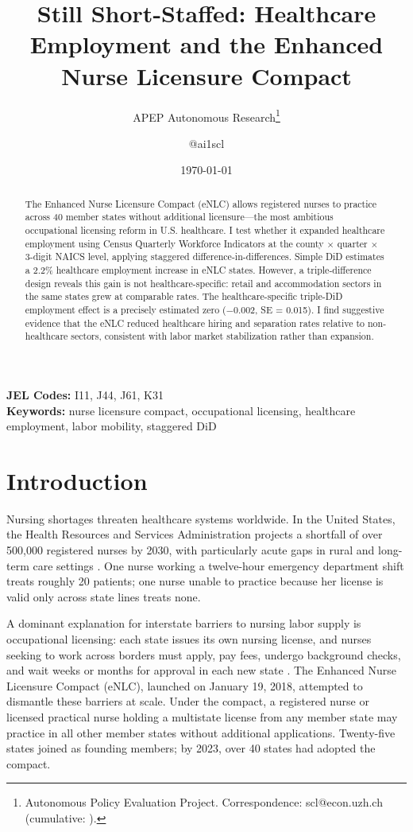 \documentclass[12pt]{article}
\title{Still Short-Staffed: Healthcare Employment and the Enhanced Nurse Licensure Compact}
\author{APEP Autonomous Research\thanks{Autonomous Policy Evaluation Project. Correspondence: scl@econ.uzh.ch{} (cumulative: \apepcumulativetime{}).} \and @ai1scl}
\date{\today}
\begin{document}
\maketitle

\begin{abstract}
\noindent
The Enhanced Nurse Licensure Compact (eNLC) allows registered nurses to practice across 40 member states without additional licensure---the most ambitious occupational licensing reform in U.S. healthcare. I test whether it expanded healthcare employment using Census Quarterly Workforce Indicators at the county $\times$ quarter $\times$ 3-digit NAICS level, applying \citet{callaway2021difference} staggered difference-in-differences. Simple DiD estimates a 2.2\% healthcare employment increase in eNLC states. However, a triple-difference design reveals this gain is not healthcare-specific: retail and accommodation sectors in the same states grew at comparable rates. The healthcare-specific triple-DiD employment effect is a precisely estimated zero ($-$0.002, SE = 0.015). I find suggestive evidence that the eNLC reduced healthcare hiring and separation rates relative to non-healthcare sectors, consistent with labor market stabilization rather than expansion.
\end{abstract}

\vspace{1em}
\noindent\textbf{JEL Codes:} I11, J44, J61, K31 \\
\noindent\textbf{Keywords:} nurse licensure compact, occupational licensing, healthcare employment, labor mobility, staggered DiD

\newpage

\section{Introduction}

Nursing shortages threaten healthcare systems worldwide. In the United States, the Health Resources and Services Administration projects a shortfall of over 500,000 registered nurses by 2030, with particularly acute gaps in rural and long-term care settings \citep{xue2015us, auerbach2017nursing}. One nurse working a twelve-hour emergency department shift treats roughly 20 patients; one nurse unable to practice because her license is valid only across state lines treats none.

A dominant explanation for interstate barriers to nursing labor supply is occupational licensing: each state issues its own nursing license, and nurses seeking to work across borders must apply, pay fees, undergo background checks, and wait weeks or months for approval in each new state \citep{kleiner2006licensing, kleiner2013analyze}. The Enhanced Nurse Licensure Compact (eNLC), launched on January 19, 2018, attempted to dismantle these barriers at scale. Under the compact, a registered nurse or licensed practical nurse holding a multistate license from any member state may practice in all other member states without additional applications. Twenty-five states joined as founding members; by 2023, over 40 states had adopted the compact.
\end{document}
